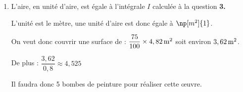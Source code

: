 \begin{enumerate}
\begin{enumerate}
soit $2,43\,\rm{m}$ au centimètre près.

	\item L'aire, en unité d'aire,  est égale à l'intégrale $I$ calculée à la question \textbf{3.}

L'unité est le mètre, une unité d'aire est donc égale à $\np[m^2]{1}$.

On veut donc couvrir une surface de : \quad $\dfrac{75}{100} \times 4,82 \, \rm{m}^2$ soit environ $3,62 \,\rm{m}^2$.

De plus : $\dfrac{3,62}{0,8} \approx 4,525$

Il faudra donc 5 bombes de peinture pour réaliser cette œuvre.
	\end{enumerate}
\end{enumerate}
\medskip

